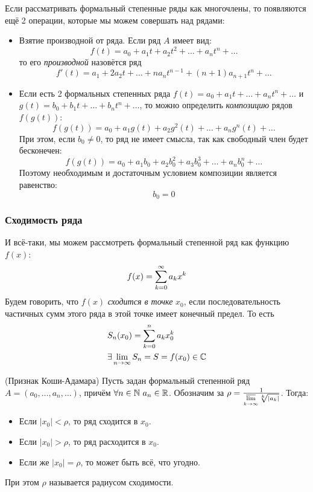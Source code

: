 Если рассматривать формальный степенные ряды как многочлены, то появляются ещё 2 операции, которые мы можем совершать над рядами:
\begin{itemize}
	\item Взятие производной от ряда. Если ряд $A$ имеет вид:
	\[
		f(t) = a_0 + a_1 t + a_2 t^2 + \ldots + a_n t^n + \ldots
	\]
	то его \textit{производной} назовётся ряд
	\[
		f'(t) = a_1 + 2a_2 t + \ldots + na_n t^{n - 1} + (n + 1) a_{n + 1} t^n + \ldots
	\]
	
	\item Если есть 2 формальных степенных ряда $f(t) = a_0 + a_1 t + \ldots + a_n t^n + \ldots$ и $g(t) = b_0 + b_1 t + \ldots + b_n t^n + \ldots$, то можно определить \textit{композицию} рядов $f(g(t))$:
	\[
		f(g(t)) = a_0 + a_1 g(t) + a_2 g^2(t) + \ldots + a_n g^n(t) + \ldots
	\]
	При этом, если $b_0 \neq 0$, то ряд не имеет смысла, так как свободный член будет бесконечен:
	\[
		f(g(t)) = a_0 + a_1 b_0 + a_2 b_0^2 + a_3 b_0^3 + \ldots + a_n b_0^n + \ldots
	\]
	Поэтому необходимым и достаточным условием композиции является равенство:
	\[
		b_0 = 0
	\]
\end{itemize}

\subsubsection*{Сходимость ряда}

\begin{definition}
	И всё-таки, мы можем рассмотреть формальный степенной ряд как функцию $f(x)$:
	\[
		f(x) = \sum\limits_{k = 0}^\infty a_k x^k
	\]
	Будем говорить, что $f(x)$ \textit{сходится в точке} $x_0$, если последовательность частичных сумм этого ряда в этой точке имеет конечный предел. То есть
	\begin{align*}
		&{S_n(x_0) = \sum\limits_{k = 0}^n a_k x_0^k}
		\\
		&{\exists \lim\limits_{n \to \infty} S_n = S = f(x_0) \in \mathbb{C}}
	\end{align*}
\end{definition}

\begin{theorem} (Признак Коши-Адамара)
	Пусть задан формальный степенной ряд $A = (a_0, \ldots, a_n, \ldots)$, причём $\forall n \in \mathbb{N}\ a_n \in \mathbb{R}$. Обозначим за $\rho = \frac{1}{\varlimsup\limits_{k \to \infty} \sqrt[k]{|a_k|}}$. Тогда:
	\begin{itemize}
		\item Если $|x_0| < \rho$, то ряд сходится в $x_0$.
		
		\item Если $|x_0| > \rho$, то ряд расходится в $x_0$.
		
		\item Если же $|x_0| = \rho$, то может быть всё, что угодно.
	\end{itemize}
	При этом $\rho$ называется радиусом сходимости.
\end{theorem}

